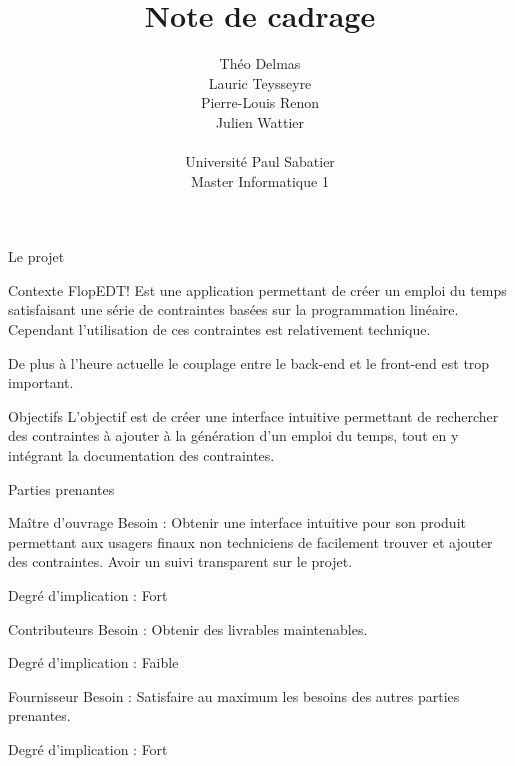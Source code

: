 \documentclass[]{article}
\title{Note de cadrage}
\author{
    Théo Delmas\\
    Lauric Teysseyre\\
    Pierre-Louis Renon\\
    Julien Wattier\\
    \\
    Université Paul Sabatier\\
    Master Informatique 1\\
   }
\date{}
\begin{document}
    \maketitle
    \newpage
    \tableofcontents
    \newpage

    \begin{section}{Le projet}
        \begin{subsection}{Contexte}
            FlopEDT! Est une application permettant de créer un emploi du temps satisfaisant une série de contraintes basées sur 
            la programmation linéaire. Cependant l’utilisation de ces contraintes est relativement technique.

            De plus à l’heure actuelle le couplage entre le back-end et le front-end est trop important.
        \end{subsection}

        \begin{subsection}{Objectifs}
            L’objectif est de créer une interface intuitive permettant de rechercher des contraintes à ajouter à la génération 
            d’un emploi du temps, tout en y intégrant la documentation des contraintes.
        \end{subsection}

        \begin{subsection}{Parties prenantes}
            \begin{subsubsection}{Maître d'ouvrage}
                Besoin : Obtenir une interface intuitive pour son produit permettant aux usagers finaux non techniciens de 
                facilement trouver et ajouter des contraintes. Avoir un suivi transparent sur le projet. 

                Degré d’implication : Fort
            \end{subsubsection}

            \begin{subsubsection}{Contributeurs}
                Besoin : Obtenir des livrables maintenables.

                Degré d’implication : Faible
            \end{subsubsection}

            \begin{subsubsection}{Fournisseur}
                Besoin : Satisfaire au maximum les besoins des autres parties prenantes.

                Degré d’implication : Fort
            \end{subsubsection}


\end{subsection}
\end{section}
\end{document}
